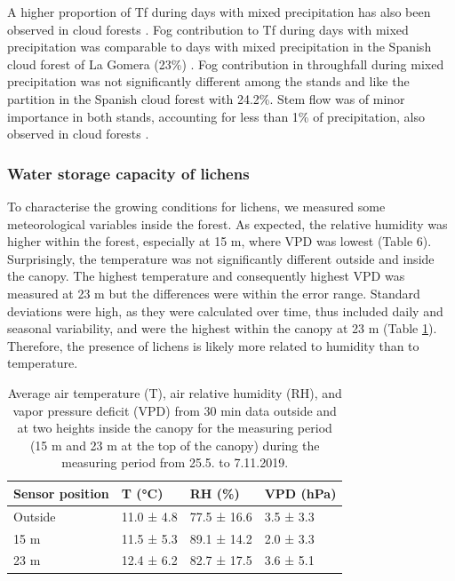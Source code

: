 \documentclass[10pt,letterpaper]{article}
\begin{document}
A higher proportion of Tf during days with mixed precipitation has also been observed in cloud forests \cite{EUGSTER2006288,Santos2004,SantosBruijnzeel2011}. Fog contribution to Tf during days with mixed precipitation was comparable to days with mixed precipitation in the Spanish cloud forest of La Gomera (23\%) \cite{e16b77c7c83b4b92b69d38a25a041d1a}. Fog contribution in throughfall during mixed precipitation was not significantly different among the stands and like the partition in the Spanish cloud forest with 24.2\%. Stem flow was of minor importance in both stands, accounting for less than 1\% of precipitation, also observed in cloud forests \cite{e16b77c7c83b4b92b69d38a25a041d1a}. 

\subsubsection{Water storage capacity of lichens}

To characterise the growing conditions for lichens, we measured some meteorological variables inside the forest. As expected, the relative humidity was higher within the forest, especially at 15 m, where VPD was lowest (Table 6). Surprisingly, the temperature was not significantly different outside and inside the canopy. The highest temperature and consequently highest VPD was measured at 23 m but the differences were within the error range. Standard deviations were high, as they were calculated over time, thus included daily and seasonal variability, and were the highest within the canopy at 23 m (Table \ref{tab06}). Therefore, the presence of lichens is likely more related to humidity than to temperature. 

\begin{table}[h!]
\caption{Average air temperature (T), air relative humidity (RH), and vapor pressure deficit (VPD) from 30 min data outside and at two heights inside the canopy for the measuring period (15 m and 23 m at the top of the canopy) during the measuring period from 25.5. to 7.11.2019.}
\label{tab06}
\setlength\tabcolsep{0pt}
\begin{tabularx}{\textwidth}{ p{4cm} p{3cm} p{3cm}  p{3cm} }
\toprule
\textbf{Sensor position} & \textbf{T (°C)} & \textbf{RH (\%)} & \textbf{VPD (hPa)} \\
\midrule
	Outside & 11.0 ± 4.8 & 77.5 ± 16.6 & 3.5 ± 3.3\\
	15 m & 11.5 ± 5.3 & 89.1 ± 14.2 & 2.0 ± 3.3\\
	23 m & 12.4 ± 6.2 & 82.7 ± 17.5 & 3.6 ± 5.1\\
\bottomrule
\end{tabularx}
\end{table} 
\end{document}
